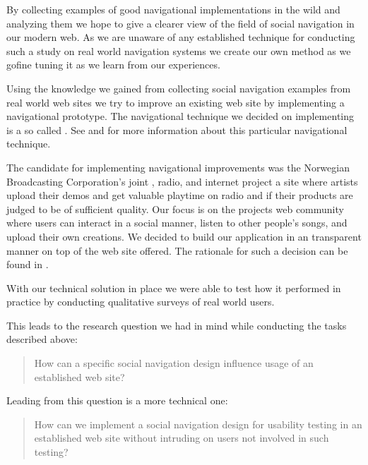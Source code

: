 By collecting examples of good navigational implementations in the wild
and analyzing them we hope to give a clearer
view of the field of social navigation in our modern web.
As we are unaware of any established technique for
conducting such a study on real world navigation systems we create our own
method as we go\dash{}fine tuning it as we learn from our experiences.

Using the knowledge we gained from collecting social navigation examples
from real world web sites we try to improve an existing web site by
implementing a navigational prototype. The navigational technique we
decided on implementing is a so called . See
 and
for more information about this particular navigational technique.

The candidate for implementing
navigational improvements was the Norwegian Broadcasting Corporation's joint
, radio, and internet project \project{\urort{}}\dash{}a site where
artists upload their demos and get valuable playtime on radio and  if
their products are judged to be of sufficient quality. Our focus is on the
projects web community%
where users can interact in a social manner, listen to other people's songs,
and upload their own creations.
We decided to build our application in an transparent manner on top of the
web site \urort{} offered. The rationale for such a decision can be found in
.

With our technical solution in place we were able to test how it performed in
practice by conducting qualitative surveys of real world users.

This leads to the research question we had in mind while conducting
the tasks described above:

\begin{quote}
  How can a specific social navigation design influence usage of
  an established web site?
\end{quote}

Leading from this question is a more technical one:

\begin{quote}
  How can we implement a social navigation design for
  usability testing in an established web site without
  intruding on users not involved in such testing?
\end{quote}

